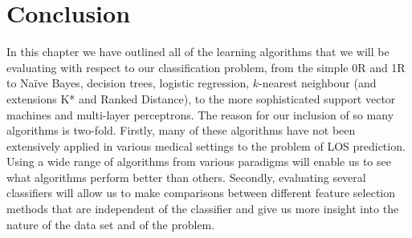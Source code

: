 \section{Conclusion}
In this chapter we have outlined all of the learning algorithms that we will
be evaluating with respect to our classification problem, from the simple
0R and 1R to Na\"{i}ve Bayes, decision trees, logistic regression,
$k$-nearest neighbour (and extensions K* and Ranked Distance), to the more
sophisticated support vector machines and multi-layer perceptrons. The reason
for our inclusion of so many algorithms is two-fold. Firstly, many of
these algorithms have not been extensively applied in various medical settings
to the problem of LOS prediction. Using a wide range of algorithms from various
paradigms will enable us to see what algorithms perform better than others.
Secondly, evaluating several classifiers will allow us to make comparisons
between different feature selection methods that are independent of the
classifier and give us more insight into the nature of the data set and of the
problem.
